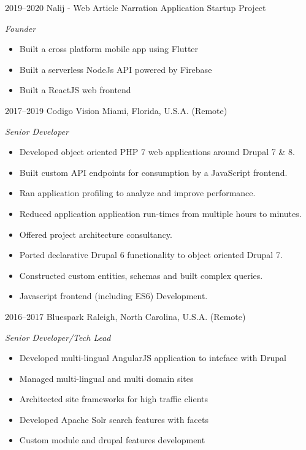 \documentclass[]{friggeri-cv} %
\begin{document}
\begin{entrylist}
\entry
{2019--2020}
{Nalij - Web Article Narration Application}
{Startup Project}
{\emph{Founder}
\begin{itemize}
\item Built a cross platform mobile app using Flutter
\item Built a serverless NodeJs API powered by Firebase
\item Built a ReactJS web frontend
\end{itemize}}

\entry
{2017--2019}
{Codigo Vision}
{Miami, Florida, U.S.A. (Remote)}
{\emph{Senior Developer}
\begin{itemize}
\item Developed object oriented PHP 7 web applications around Drupal 7 \& 8.
\item Built custom API endpoints for consumption by a JavaScript frontend.
\item Ran application profiling to analyze and improve performance.
\item Reduced application application run-times from multiple hours to minutes.
\item Offered project architecture consultancy.
\item Ported declarative Drupal 6 functionality to object oriented Drupal 7.
\item Constructed custom entities, schemas and built complex queries.
\item Javascript frontend (including ES6) Development.
\end{itemize}}

\entry
{2016--2017}
{Bluespark}
{Raleigh, North Carolina, U.S.A. (Remote)}
{\emph{Senior Developer/Tech Lead}
\begin{itemize}
\item Developed multi-lingual AngularJS application to inteface with Drupal
\item Managed multi-lingual and multi domain sites
\item Architected site frameworks for high traffic clients
\item Developed Apache Solr search features with facets
\item Custom module and drupal features development
\end{itemize}}


\end{entrylist}
\end{document}
